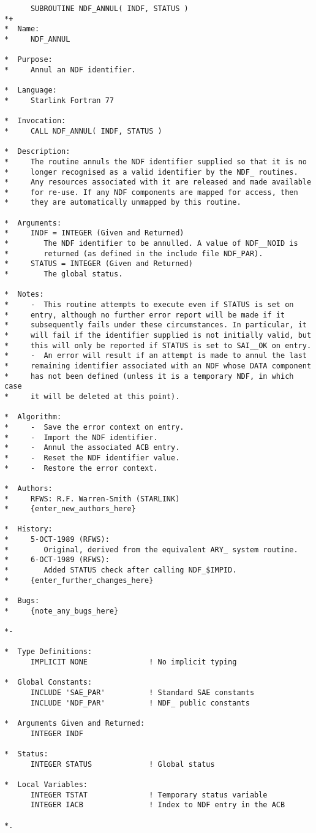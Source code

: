 \small
\begin{verbatim}
      SUBROUTINE NDF_ANNUL( INDF, STATUS )
*+
*  Name:
*     NDF_ANNUL

*  Purpose:
*     Annul an NDF identifier.

*  Language:
*     Starlink Fortran 77

*  Invocation:
*     CALL NDF_ANNUL( INDF, STATUS )

*  Description:
*     The routine annuls the NDF identifier supplied so that it is no
*     longer recognised as a valid identifier by the NDF_ routines.
*     Any resources associated with it are released and made available
*     for re-use. If any NDF components are mapped for access, then
*     they are automatically unmapped by this routine.

*  Arguments:
*     INDF = INTEGER (Given and Returned)
*        The NDF identifier to be annulled. A value of NDF__NOID is
*        returned (as defined in the include file NDF_PAR).
*     STATUS = INTEGER (Given and Returned)
*        The global status.

*  Notes:
*     -  This routine attempts to execute even if STATUS is set on
*     entry, although no further error report will be made if it
*     subsequently fails under these circumstances. In particular, it
*     will fail if the identifier supplied is not initially valid, but
*     this will only be reported if STATUS is set to SAI__OK on entry.
*     -  An error will result if an attempt is made to annul the last
*     remaining identifier associated with an NDF whose DATA component
*     has not been defined (unless it is a temporary NDF, in which case
*     it will be deleted at this point).

*  Algorithm:
*     -  Save the error context on entry.
*     -  Import the NDF identifier.
*     -  Annul the associated ACB entry.
*     -  Reset the NDF identifier value.
*     -  Restore the error context.

*  Authors:
*     RFWS: R.F. Warren-Smith (STARLINK)
*     {enter_new_authors_here}

*  History:
*     5-OCT-1989 (RFWS):
*        Original, derived from the equivalent ARY_ system routine.
*     6-OCT-1989 (RFWS):
*        Added STATUS check after calling NDF_$IMPID.
*     {enter_further_changes_here}

*  Bugs:
*     {note_any_bugs_here}

*-

*  Type Definitions:
      IMPLICIT NONE              ! No implicit typing

*  Global Constants:
      INCLUDE 'SAE_PAR'          ! Standard SAE constants
      INCLUDE 'NDF_PAR'          ! NDF_ public constants

*  Arguments Given and Returned:
      INTEGER INDF

*  Status:
      INTEGER STATUS             ! Global status

*  Local Variables:
      INTEGER TSTAT              ! Temporary status variable
      INTEGER IACB               ! Index to NDF entry in the ACB

*.
\end{verbatim}
\normalsize

